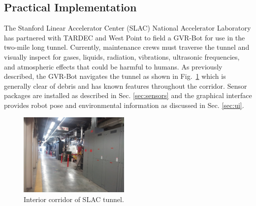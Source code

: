 \subsection{Practical Implementation}\label{sec:practical}

The Stanford Linear Accelerator Center (SLAC) National Accelerator Laboratory has partnered with TARDEC and West Point to field a GVR-Bot for use in the two-mile long tunnel. Currently, maintenance crews must traverse the tunnel and visually inspect for gases, liquids, radiation, vibrations, ultrasonic frequencies, and atmospheric effects that could be harmful to humans. As previously described, the GVR-Bot navigates the tunnel as shown in Fig.~\ref{fig:tunnel} which is generally clear of debris and has known features throughout the corridor. Sensor packages are installed as described in Sec. \ref{sec:sensors} and the graphical interface provides robot pose and environmental information as discussed in Sec. \ref{sec:ui}.

\begin{figure}
	\centering
	\includegraphics[width=0.48\textwidth]{./pictures/slac-tunnel.jpg}
	\caption{Interior corridor of SLAC tunnel.}
	\label{fig:tunnel}
\end{figure}
